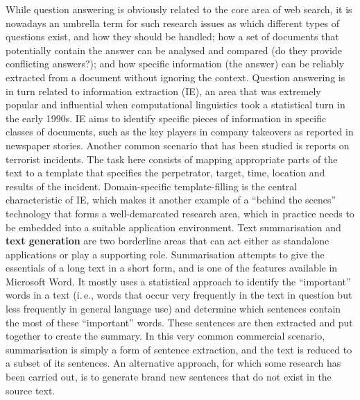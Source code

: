 \documentclass[]{../../metanetpaper}
\begin{document}
\begin{multicols}{2}
While question answering is obviously related to the core area of web search, it is nowadays an umbrella term for such research issues as which different types of questions exist, and how they should be handled; how a set of documents that potentially contain the answer can be analysed and compared (do they provide conflicting answers?); and how specific information (the answer) can be reliably extracted from a document without ignoring the context. Question answering is in turn related to information extraction (IE), an area that was extremely popular and influential when computational linguistics took a statistical turn in the early 1990s. IE aims to identify specific pieces of information in specific classes of documents, such as the key players in company takeovers as reported in newspaper stories. Another common scenario that has been studied is reports on terrorist incidents. The task here consists of mapping appropriate parts of the text to a template that specifies the perpetrator, target, time, location and results of the incident. Domain-specific template-filling is the central characteristic of IE, which makes it another example of a “behind the scenes” technology that forms a well-demarcated research area, which in practice needs to be embedded into a suitable application environment.
Text summarisation and \textbf{text generation} are two borderline areas that can act either as standalone applications or play a supporting role. Summarisation attempts to give the essentials of a long text in a short form, and is one of the features available in Microsoft Word. It mostly uses a statistical approach to identify the “important” words in a text (i.\,e., words that occur very frequently in the text in question but less frequently in general language use) and determine which sentences contain the most of these “important” words. These sentences are then extracted and put together to create the summary. In this very common commercial scenario, summarisation is simply a form of sentence extraction, and the text is reduced to a subset of its sentences. An alternative approach, for which some research has been carried out, is to generate brand new sentences that do not exist in the source text.

\end{multicols}
\end{document}
